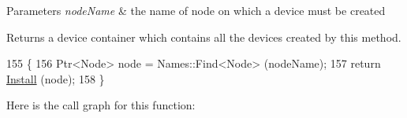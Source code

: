 \begin{DoxyParams}{Parameters}
{\em node\+Name} & the name of node on which a device must be created \\
\hline
\end{DoxyParams}
\begin{DoxyReturn}{Returns}
a device container which contains all the devices created by this method. 
\end{DoxyReturn}

\begin{DoxyCode}
155 \{
156   Ptr<Node> node = Names::Find<Node> (nodeName);
157   \textcolor{keywordflow}{return} \hyperlink{classns3_1_1WaveformGeneratorHelper_a61d491cf9b6488bf5ff1b7ae2f245eb0}{Install} (node);
158 \}
\end{DoxyCode}


Here is the call graph for this function\+:


